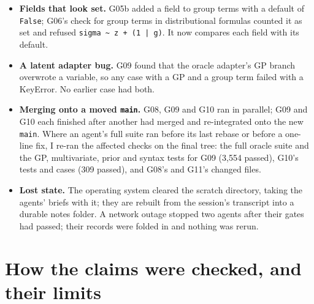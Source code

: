 \documentclass[11pt]{article}
\newcommand{\code}[1]{\texttt{#1}}
\begin{document}
\begin{itemize}
\item \textbf{Fields that look set.} G05b added a field to group terms with a default of \code{False}; G06's check for
  group terms in distributional formulas counted it as set and refused \code{sigma \textasciitilde{} z + (1 | g)}. It now
  compares each field with its default.
\item \textbf{A latent adapter bug.} G09 found that the oracle adapter's GP branch overwrote a variable, so any case with a
  GP and a group term failed with a KeyError. No earlier case had both.
\item \textbf{Merging onto a moved \code{main}.} G08, G09 and G10 ran in parallel; G09 and G10 each finished after another
  had merged and re-integrated onto the new \code{main}. Where an agent's full suite ran before its last rebase or before a
  one-line fix, I re-ran the affected checks on the final tree: the full oracle suite and the GP, multivariate, prior and
  syntax tests for G09 (3{,}554 passed), G10's tests and cases (309 passed), and G08's and G11's changed files.
\item \textbf{Lost state.} The operating system cleared the scratch directory, taking the agents' briefs with it; they are
  rebuilt from the session's transcript into a durable notes folder. A network outage stopped two agents after their gates
  had passed; their records were folded in and nothing was rerun.
\end{itemize}

\section{How the claims were checked, and their limits}
\label{sec:checks}
\end{document}
